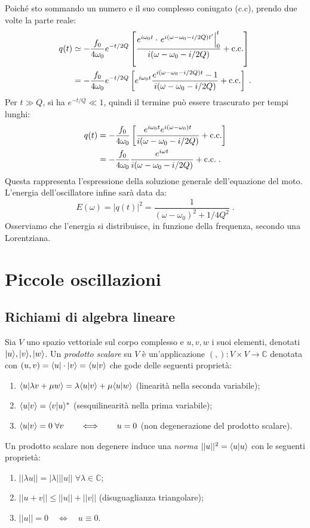 Poiché sto sommando un numero e il suo complesso coniugato (c.c), prendo due volte la parte reale:
\begin{align}
q(t)&\simeq -\frac{f_0}{4\omega_0}e^{-t/2Q}\left[\frac{e^{i\omega_0t}\cdot \left. e^{i(\omega-\omega_0-i/2Q)t'}\right|_0^t}{i(\omega-\omega_0-i/2Q)}+\mbox{c.c.}\right] \notag \\
&=-\frac{f_0}{4\omega_0}e^{-t/2Q}\left[e^{i\omega_0t}\frac{e^{i(\omega-\omega_0-i/2Q)t}-1}{i(\omega-\omega_0-i/2Q)}+\mbox{c.c.}\right]\;.
\end{align}
Per $t\gg Q$, si ha $e^{-t/Q}\ll 1$, quindi il termine può essere trascurato per tempi lunghi:
\begin{align}
q(t)&= -\frac{f_0}{4\omega_0}\left[\frac{e^{i\omega_0t}e^{i(\omega-\omega_0)t}}{i(\omega-\omega_0-i/2Q)}+\mbox{c.c.}\right] \notag \\
&= -\frac{f_0}{4\omega_0}\frac{e^{i\omega t}}{i(\omega-\omega_0-i/2Q)}+\mbox{c.c.}\;.
\end{align}
Questa rappresenta l'espressione della soluzione generale dell'equazione del moto. L'energia dell'oscillatore infine sarà data da:
\begin{equation}
E(\omega)=|q(t)|^2=\frac{1}{(\omega-\omega_0)^2+1/4Q^2}\;.
\end{equation}
Osserviamo che l'energia si distribuisce, in funzione della frequenza, secondo una Lorentziana.
\pagebreak
\section{Piccole oscillazioni}
\subsection{Richiami di algebra lineare}
Sia $V$ uno spazio vettoriale sul corpo complesso e $u,v,w$ i suoi elementi, denotati $| u\rangle,|v\rangle,|w\rangle$. Un \textit{prodotto scalare} su $V$ è un'applicazione $({},{}):V\times V\to\mathbb{C}$ denotata con $(u,v)=\langle u|\cdot|v\rangle=\langle u|v\rangle$ che gode delle seguenti proprietà:
\begin{enumerate}
\item $\langle u|\lambda v+\mu w\rangle=\lambda\langle u|v\rangle+\mu \langle u|w\rangle$ (linearità nella seconda variabile);
\item $\langle u|v\rangle=\langle v|u\rangle^*$ (sesquilinearità nella prima variabile);
\item $\langle u|v\rangle=0\; \forall v\qquad  \Longleftrightarrow \qquad u= 0$ (non degenerazione del prodotto scalare).
\end{enumerate}
Un prodotto scalare non degenere induce una \textit{norma} $||u||^2=\langle u|u\rangle$ con le seguenti proprietà:
\begin{enumerate}
\item $||\lambda u||=|\lambda|||u||\; \forall \lambda\in \mathbb{C}$;
\item $||u+v||\le||u||+||v||$ (disuguaglianza triangolare);
\item $||u||=0 \quad \Longleftrightarrow\quad  u\equiv 0$.
\end{enumerate}
